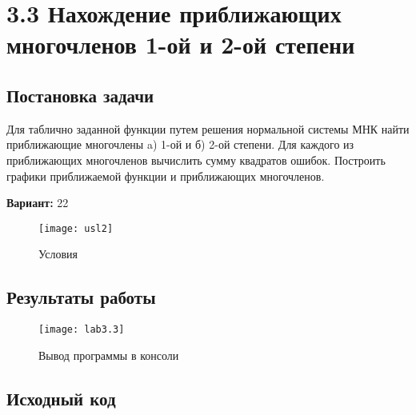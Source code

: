 \section* {3.3  Нахождение приближающих многочленов 1-ой и 2-ой степени}

\subsection{Постановка задачи}
Для таблично заданной функции путем решения нормальной системы МНК найти приближающие многочлены a) 1-ой и б) 2-ой степени. Для каждого из приближающих многочленов вычислить сумму квадратов ошибок. Построить графики приближаемой функции и приближающих многочленов.
 

{\bfseries Вариант:} 22

\begin{figure}[h!]
\centering
\texttt{[image: usl2]}
\caption{Условия}
\end{figure}

\subsection{Результаты работы}
\begin{figure}[h!]
\centering
\texttt{[image: lab3.3]}
\caption{Вывод программы в консоли}
\end{figure}


\pagebreak

\subsection{Исходный код}
% 




% 
% 
% 